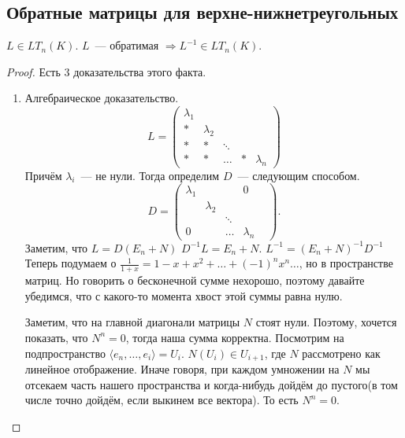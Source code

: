 \subsection{Обратные матрицы для верхне-нижнетреугольных}
\begin{statement}
     $L\in LT_n(K)$. $L$~--- обратимая $\Rightarrow L^{-1}\in LT_n(K)$.
\end{statement}
\begin{proof}
    Есть 3 доказательства этого факта.
    \begin{enumerate}
        \item Алгебраическое доказательство.\\
            $$L = 
            \begin{pmatrix}
                \lambda_1&&&\\
                *&\lambda_2&&\\
                *&*&\ddots&&\\
                *&*&\dots&*&\lambda_n
            \end{pmatrix}$$
            Причём $\lambda_i$~--- не нули. Тогда определим $D$~--- следующим способом.
            \[
            D = \begin{pmatrix}
                \lambda_1&&&0\\
                &\lambda_2&&\\
                &&\ddots&&\\
                0&&\dots&\lambda_n
            \end{pmatrix}
            .\] 
            Заметим, что $L = D(E_n + N)$
            $D^{-1}L = E_n + N$. 
            $L^{-1} = (E_n + N)^{-1}D^{-1}$ 
            Теперь подумаем о $\frac{1}{1+x} = 1 - x + x^2 +\dots +(-1)^nx^n\dots$,
            но в пространстве матриц.
            Но говорить о бесконечной сумме нехорошо, поэтому давайте убедимся,
            что с какого-то момента хвост этой суммы равна нулю.

            Заметим, что на главной диагонали матрицы $N$ стоят нули. Поэтому, хочется
            показать, что $N^n = 0$, тогда наша сумма корректна.
            Посмотрим на подпространство $\langle e_n,\dots, e_i\rangle = U_i$.
            $N(U_i)\in U_{i+1}$, где $N$ рассмотрено как линейное отображение.
            Иначе говоря, при каждом умножении на $N$ мы отсекаем часть нашего пространства
            и когда-нибудь дойдём до пустого(в том числе точно дойдём, если выкинем все вектора).
            То есть $N^n = 0$. 


\end{enumerate}
\end{proof}
